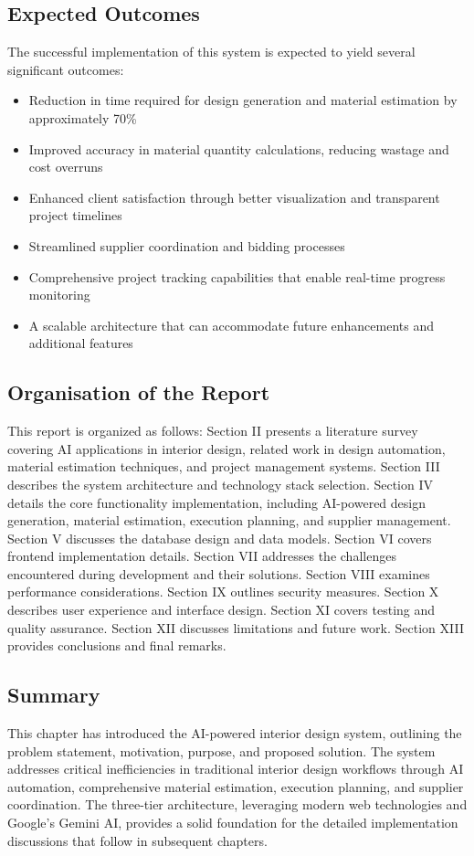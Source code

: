 \documentclass[conference]{IEEEtran}
\begin{document}
\subsection{Expected Outcomes}
The successful implementation of this system is expected to yield several significant outcomes:
\begin{itemize}
    \item Reduction in time required for design generation and material estimation by approximately 70\%
    \item Improved accuracy in material quantity calculations, reducing wastage and cost overruns
    \item Enhanced client satisfaction through better visualization and transparent project timelines
    \item Streamlined supplier coordination and bidding processes
    \item Comprehensive project tracking capabilities that enable real-time progress monitoring
    \item A scalable architecture that can accommodate future enhancements and additional features
\end{itemize}

\subsection{Organisation of the Report}
This report is organized as follows: Section II presents a literature survey covering AI applications in interior design, related work in design automation, material estimation techniques, and project management systems. Section III describes the system architecture and technology stack selection. Section IV details the core functionality implementation, including AI-powered design generation, material estimation, execution planning, and supplier management. Section V discusses the database design and data models. Section VI covers frontend implementation details. Section VII addresses the challenges encountered during development and their solutions. Section VIII examines performance considerations. Section IX outlines security measures. Section X describes user experience and interface design. Section XI covers testing and quality assurance. Section XII discusses limitations and future work. Section XIII provides conclusions and final remarks.

\subsection{Summary}
This chapter has introduced the AI-powered interior design system, outlining the problem statement, motivation, purpose, and proposed solution. The system addresses critical inefficiencies in traditional interior design workflows through AI automation, comprehensive material estimation, execution planning, and supplier coordination. The three-tier architecture, leveraging modern web technologies and Google's Gemini AI, provides a solid foundation for the detailed implementation discussions that follow in subsequent chapters.
\end{document}
